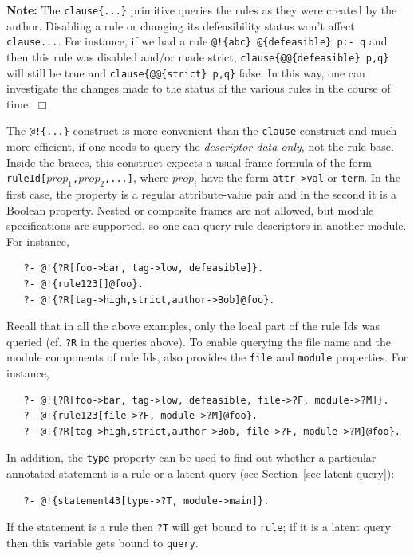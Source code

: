 \documentclass[11pt]{article}
\newcommand{\ERGO}{\mbox{\smaller{\ensuremath{\cal{E}}\smaller{{\sc{RGO}}}}}\xspace}
\newcommand{\FLSYSTEM}{\ERGO}
\begin{document}
\noindent
\textbf{Note:} The \texttt{clause\{...\}} primitive queries the rules as
they were created by the author. Disabling a rule or changing its
defeasibility status won't affect \texttt{clause{...}}.
For instance, if we had a
rule \texttt{@!\{abc\} @\{defeasible\} p:- q}
and then this rule was disabled and/or
made strict, \texttt{clause\{@@\{defeasible\} p,q\}}
will still be true and
\texttt{clause\{@@\{strict\} p,q\}} 
false. In this way, one can investigate the changes
made to the status of the various rules in the course of time.   
\hfill $\Box$

The \texttt{@!\{...\}} construct is more convenient than the
\texttt{clause}-construct and much more efficient,
if one needs to query the \emph{descriptor data
  only}, not the rule base. Inside the braces, this construct expects a
usual frame formula of the form \texttt{ruleId[$prop_1$,$prop_2$,...]}, where
$prop_i$ have the form \texttt{attr->val} or \texttt{term}. In the first
case, the property is a regular attribute-value pair and in the second it
is a Boolean property. Nested or composite frames are not allowed, but
module specifications are supported, so one can query rule descriptors in
another module. For instance,
\begin{verbatim}
   ?- @!{?R[foo->bar, tag->low, defeasible]}.
   ?- @!{rule123[]@foo}.
   ?- @!{?R[tag->high,strict,author->Bob]@foo}.
\end{verbatim}
Recall that in all the above examples, only the local part of the rule Ids was
queried (cf. \texttt{?R} in the queries above). To enable querying the file
name and the module components of rule Ids, \FLSYSTEM also provides the
\texttt{file} and \texttt{module} properties. For instance,
\begin{verbatim}
   ?- @!{?R[foo->bar, tag->low, defeasible, file->?F, module->?M]}.
   ?- @!{rule123[file->?F, module->?M]@foo}.
   ?- @!{?R[tag->high,strict,author->Bob, file->?F, module->?M]@foo}.
\end{verbatim}
In addition, the \texttt{type}  property can be used to find out whether a particular
annotated statement is a rule or a latent query (see
Section~\ref{sec-latent-query}):
\begin{verbatim}
   ?- @!{statement43[type->?T, module->main]}.
\end{verbatim}
If the statement is a rule then \texttt{?T} will get bound to
\texttt{rule}; if it is a latent query then this variable gets
bound to \texttt{query}. 
\end{document}
